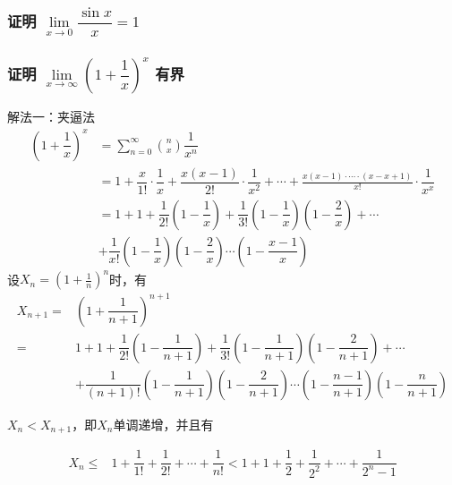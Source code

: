 \documentclass[a4paper, 12pt, draft]{article}
\begin{document}
    \subsubsection{证明 $ \lim\limits_{x \to 0 } \dfrac{\sin{x}}{x} = 1 $}


    \subsubsection{证明 $\lim\limits_{x \to \infty} \left( 1 + \dfrac{1}{x} \right)^{x}$ 有界}

    解法一：夹逼法
    \begin{equation*}
        \begin{aligned}
            \left( 1 + \dfrac{1}{x} \right)^{x} &= \sum\limits_{n = 0}^{\infty} \binom{n}{x} \dfrac{1}{x^n} \\
                        &= 1 + \dfrac{x}{1!} \cdot \dfrac{1}{x} + \dfrac{x(x-1)}{2!} \cdot \dfrac{1}{x^2} + \cdots + \frac{x(x-1)\cdot \cdots \cdot (x - x + 1)}{x!} \cdot \dfrac{1}{x^x} \\ 
                        &= 1 + 1 + \dfrac{1}{2!} \left( 1 - \dfrac{1}{x}  \right) + \dfrac{1}{3!} \left(1 - \dfrac{1}{x} \right)\left(1 - \dfrac{2}{x} \right) + \cdots \\
                        & + \dfrac{1}{x!} \left(1 - \dfrac{1}{x} \right)\left(1 - \dfrac{2}{x} \right) \cdots \left(1 - \dfrac{x - 1}{x} \right)
        \end{aligned}
    \end{equation*}
    设$X_n = \left(1+ \frac{1}{n}\right)^n$时，有
    \begin{equation*}
        \begin{aligned}
            X_{n+1} = &\left( 1 + \dfrac{1}{n+1} \right)^{n+1} \\
                = & 1 + 1 + \dfrac{1}{2!} \left( 1 - \dfrac{1}{n+1}  \right) + \dfrac{1}{3!} \left(1 - \dfrac{1}{n+1} \right)\left(1 - \dfrac{2}{n+1} \right) + \cdots \\
                & + \dfrac{1}{(n+1)!} \left(1 - \dfrac{1}{n+1} \right)\left(1 - \dfrac{2}{n+1} \right) \cdots \left(1 - \dfrac{n - 1}{n+1} \right)\left(1 - \dfrac{n}{n+1} \right)
        \end{aligned}
    \end{equation*}
    
    
    $X_n < X_{n+1}$，即$X_{n}$单调递增，并且有
    
    \begin{5pt}
        \[
        \begin{aligned}
            X_n \leq & 1 + \dfrac{1}{1!} + \dfrac{1}{2!} + \cdots + \dfrac{1}{n!} < 1 + 1 + \dfrac{1}{2}
            + \dfrac{1}{2^2} + \cdots + \dfrac{1}{2^n-1}
        \end{aligned}
        \]
    \end{5pt}
    
\end{document}
